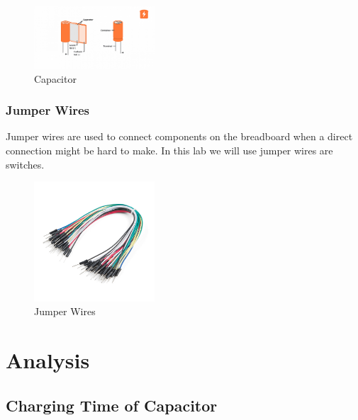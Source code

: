\documentclass[a4paper, 10pt]{article}
\begin{document}
				\begin{figure}[h!]
					\centering
					\includegraphics[width=0.4\textwidth]{./images/basics-capacitor-thumbnail.png}
					\caption{Capacitor}
					\label{fig:capacitor}
				\end{figure}

				\pagebreak
			\subsubsection{Jumper Wires}
				Jumper wires are used to connect components on the breadboard when a direct connection might be hard to make. 
				In this lab we will use jumper wires are switches.\\

				\begin{figure}[h!]
					\centering
					\includegraphics[width=0.4\textwidth]{./images/JumperWires.jpeg}
					\caption{Jumper Wires}
					\label{fig:jumper_wires}
				\end{figure}

				\pagebreak
				\section{Analysis}
					\subsection{Charging Time of Capacitor}
\end{document}
